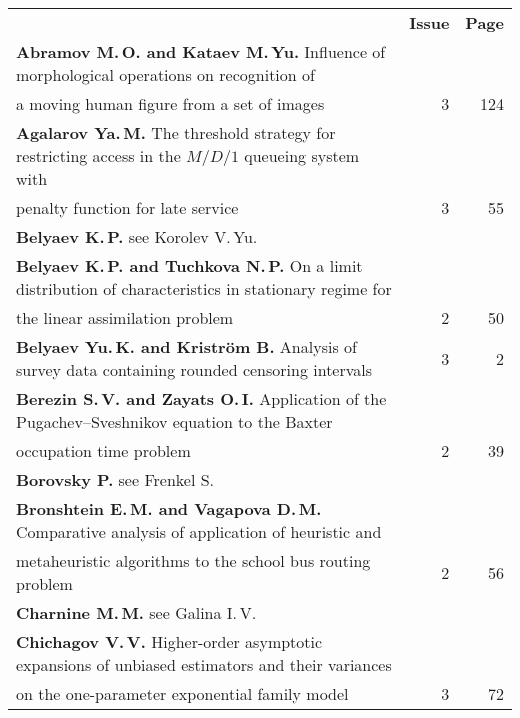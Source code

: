 {\tabcolsep=2.8pt
\begin{tabular}{p{399pt}rr}
&\textbf{Issue} & \textbf{Page}\\[6pt]
\textbf{Abramov M.\,O. and Kataev M.\,Yu.} Influence of morphological
operations on recognition of\linebreak
\\[-12pt]
\hspace*{21pt}a moving human figure from a set of
images&3&124\\
\textbf{Agalarov Ya.\,M.} The threshold strategy for restricting access in the
$M/D/1$ queueing system with\linebreak
\\[-12pt]
\hspace*{21pt}penalty function for late service&3&55\\
\textbf{Belyaev K.\,P.} see Korolev V.\,Yu.&&\\
\textbf{Belyaev K.\,P. and Tuchkova N.\,P.} On a limit distribution of characteristics in
stationary regime for\linebreak
\\[-12pt]
\hspace*{21pt}the linear assimilation problem&2&50\\
\textbf{Belyaev Yu.\,K. and Kristr\"{o}m B.} Analysis of survey data
containing rounded censoring intervals&3&2\\
\textbf{Berezin S.\,V. and Zayats O.\,I.} Application of the
Pugachev--Sveshnikov equation to the Baxter\linebreak
\\[-12pt]
\hspace*{21pt}occupation time problem&2&39\\
\textbf{Borovsky P.} see Frenkel S.&&\\
\textbf{Bronshtein E.\,M. and Vagapova D.\,M.} Comparative analysis of
application of heuristic and\linebreak
\\[-12pt]
\hspace*{21pt}metaheuristic algorithms to the school bus routing
problem&2&56\\
\textbf{Charnine M.\,M.} see Galina I.\,V.&&\\
\textbf{Chichagov V.\,V.} Higher-order asymptotic expansions of unbiased
estimators and their variances\linebreak
\\[-12pt]
\hspace*{21pt}on the one-parameter exponential family
model&3&72\\

\end{tabular}}
